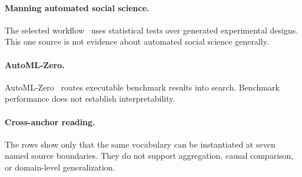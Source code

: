 \documentclass{article}
\begin{document}
\paragraph{Manning automated social science.} The selected workflow~\citep{manning2024automated} uses statistical tests over generated experimental designs. This one source is not evidence about automated social science generally.

\paragraph{AutoML-Zero.} AutoML-Zero~\citep{real2020automlzero} routes executable benchmark results into search. Benchmark performance does not establish interpretability.

\paragraph{Cross-anchor reading.} The rows show only that the same vocabulary can be instantiated at seven named source boundaries. They do not support aggregation, causal comparison, or domain-level generalization.
\end{document}

